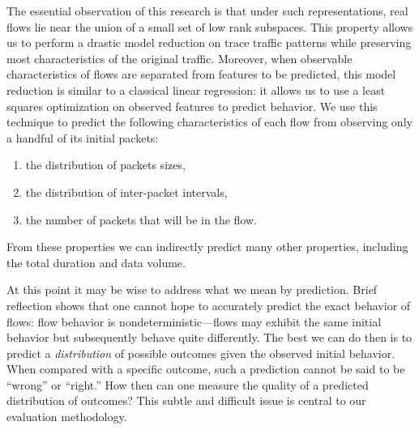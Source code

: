 \documentclass[conference]{IEEEtran}
\begin{document}
The essential observation of this research is that under such representations, real flows lie near the union of a small set of low rank subspaces.
This property allows us to perform a drastic model reduction on trace traffic patterns while preserving most characteristics of the original traffic.
Moreover, when observable characteristics of flows are separated from features to be predicted, this model reduction is similar to a classical linear regression:
it allows us to use a least squares optimization on observed features to predict behavior.
We use this technique to predict the following characteristics of each flow from observing only a handful of its initial packets:
\begin{enumerate}
  \item the distribution of packets sizes,
  \item the distribution of inter-packet intervals,
  \item the number of packets that will be in the flow.
\end{enumerate}
From these properties we can indirectly predict many other properties, including the total duration and data volume.

At this point it may be wise to address what we mean by prediction.
Brief reflection shows that one cannot hope to accurately predict the exact behavior of flows:
flow behavior is nondeterministic---flows may exhibit the same initial behavior but subsequently behave quite differently.
The best we can do then is to predict a \emph{distribution} of possible outcomes given the observed initial behavior.
When compared with a specific outcome, such a prediction cannot be said to be ``wrong'' or ``right.''
How then can one measure the quality of a predicted distribution of outcomes?
This subtle and difficult issue is central to our evaluation methodology.


\end{document}
